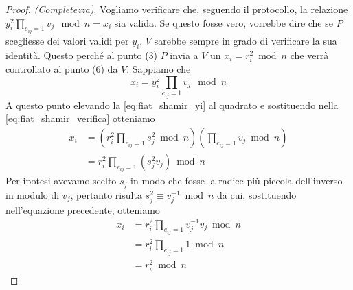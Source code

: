 \documentclass{article}
\theoremstyle{definition}
\begin{document}
\begin{proof}
    \emph{(Completezza)}.
    Vogliamo verificare che, seguendo il protocollo, la relazione $y_i^2 \prod_{e_{ij} = 1} v_j \mod n = x_i$ sia valida. Se questo fosse vero, vorrebbe dire che se $P$ scegliesse dei valori validi per $y_i$, $V$ sarebbe sempre in grado di verificare la sua identità. Questo perché al punto (3) $P$ invia a $V$ un $x_i = r_i^2 \bmod n$ che verrà controllato al punto (6) da $V$.
    Sappiamo che 
    \begin{equation*}
        x_i = y_i^2 \prod_{e_{ij} = 1} v_j \mod n
    \end{equation*}
    A questo punto elevando la \ref{eq:fiat_shamir_yi} al quadrato e sostituendo nella \ref{eq:fiat_shamir_verifica} otteniamo
    \begin{align*}
        x_i &= \left( r_i^2 \prod_{e_{ij} = 1} s_j^2 \bmod n \right) \left( \prod_{e_{ij} = 1} v_j \bmod n \right) \\
        &= r_i^2 \prod_{e_{ij} = 1} ( s_j^2 v_j ) \bmod n 
    \end{align*}
    Per ipotesi avevamo scelto $s_j$ in modo che fosse la radice più piccola dell'inverso in modulo di $v_j$, pertanto risulta $s_j^2 \equiv v_j^{-1} \bmod n$ da cui, sostituendo nell'equazione precedente, otteniamo
    \begin{align*}
        x_i &= r_i^2 \prod_{e_{ij}=1} v_j^{-1}v_j \bmod n \\
        &= r_i^2 \prod_{e_{ij}=1} 1 \bmod n \\
        &= r_i^2 \bmod n
    \end{align*}
\end{proof}
\end{document}

